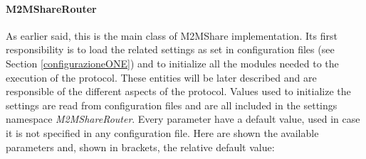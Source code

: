 \paragraph{M2MShareRouter}
As earlier said, this is the main class of M2MShare implementation. Its first responsibility is to load the related settings as set in configuration files (see Section \ref{configurazioneONE}) and to initialize all the modules needed to the execution of the protocol. These entities will be later described and are responsible of the different aspects of the protocol. Values used to initialize the settings are read from configuration files and are all included in the settings namespace \textit{M2MShareRouter}. Every parameter have a default value, used in case it is not specified in any configuration file. Here are shown the available parameters and, shown in brackets, the relative default value:
